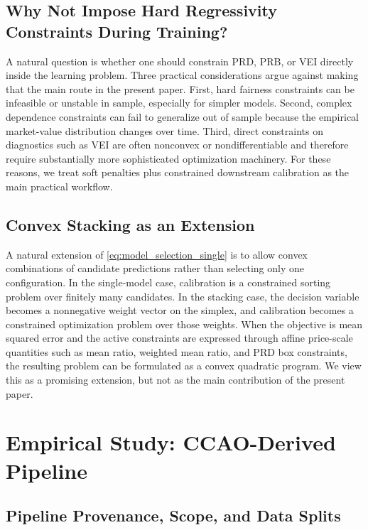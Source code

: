 \documentclass[12pt]{article}
\theoremstyle{plain}
\theoremstyle{definition}
\begin{document}
\subsection{Why Not Impose Hard Regressivity Constraints During Training?}

A natural question is whether one should constrain PRD, PRB, or VEI directly inside the learning problem. Three practical considerations argue against making that the main route in the present paper. First, hard fairness constraints can be infeasible or unstable in sample, especially for simpler models. Second, complex dependence constraints can fail to generalize out of sample because the empirical market-value distribution changes over time. Third, direct constraints on diagnostics such as VEI are often nonconvex or nondifferentiable and therefore require substantially more sophisticated optimization machinery. For these reasons, we treat soft penalties plus constrained downstream calibration as the main practical workflow.

\subsection{Convex Stacking as an Extension}

A natural extension of \eqref{eq:model_selection_single} is to allow convex combinations of candidate predictions rather than selecting only one configuration. In the single-model case, calibration is a constrained sorting problem over finitely many candidates. In the stacking case, the decision variable becomes a nonnegative weight vector on the simplex, and calibration becomes a constrained optimization problem over those weights. When the objective is mean squared error and the active constraints are expressed through affine price-scale quantities such as mean ratio, weighted mean ratio, and PRD box constraints, the resulting problem can be formulated as a convex quadratic program. We view this as a promising extension, but not as the main contribution of the present paper.

\section{Empirical Study: CCAO-Derived Pipeline}
\label{sec:empirical}

\subsection{Pipeline Provenance, Scope, and Data Splits}
\end{document}
